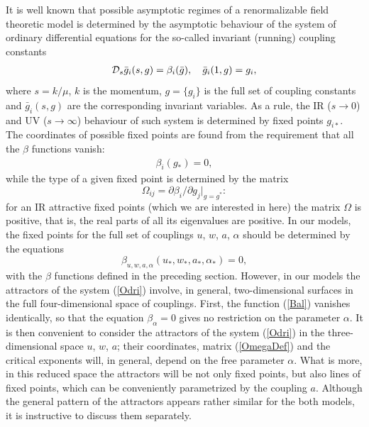 \documentclass[12pt]{article}
\def\D{{\cal D}}
\begin{document}
It is well known that possible asymptotic regimes of a renormalizable field
theoretic model is determined by the asymptotic behaviour of the system of
ordinary differential equations for the so-called invariant (running)
coupling constants
\begin{eqnarray}
\D_s \bar g_{i}(s,g) = \beta_{i} (\bar g), \quad \bar g_{i}(1,g) = g_{i},
\label{Odri}
\end{eqnarray}
where $s=k/\mu$, $k$ is the momentum,
$g= \{g_{i}\}$ is the full set of coupling constants and
$\bar g_{i}(s,g)$ are the corresponding invariant variables. As a rule,
the IR ($s\to0$) and UV ($s\to\infty$) behaviour of such system is
determined by fixed points $g_{i*}$. The coordinates of possible fixed
points are found from the requirement that all the $\beta$ functions vanish:
\begin{eqnarray}
\beta_{i} (g_{*}) =0,
\label{fp}
\end{eqnarray}
while the type of a given fixed point is determined by the matrix
\begin{equation}
\Omega_{ij} = \partial\beta_{i}/\partial g_{j} |_{g=g^*}:
\label{OmegaDef}
\end{equation}
for an IR attractive fixed points (which we are interested in here) the
matrix $\Omega$ is positive, that is, the real parts of all its eigenvalues
are positive. In our models, the fixed points for the full set of couplings
$u$, $w$, $a$, $\alpha$ should be determined by the equations
\begin{equation}
\beta_{u,w,a,\alpha} (u_{*},w_{*},a_{*},\alpha_{*}) = 0,
\label{points}
\end{equation}
with the $\beta$ functions defined in the preceding section. However, in our
models the attractors of the system (\ref{Odri}) involve, in general,
two-dimensional surfaces in the full four-dimensional space of couplings.
First, the function (\ref{Bal}) vanishes identically, so that the
equation $\beta_{\alpha}=0$ gives no restriction on the parameter $\alpha$.
It is then convenient to consider the attractors of the system (\ref{Odri})
in the three-dimensional space $u$, $w$, $a$; their coordinates, matrix
(\ref{OmegaDef}) and the critical exponents will, in general, depend on
the free parameter $\alpha$. What is more, in this reduced space the
attractors will be not only fixed points, but also lines of fixed points,
which can be conveniently parametrized by the coupling $a$. Although the
general pattern of the attractors appears rather similar for the both
models, it is instructive to discuss them separately.
\end{document}
